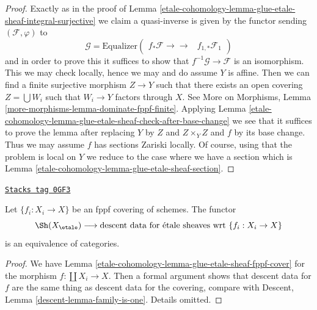 \begin{proof}
Exactly as in the proof of
Lemma \ref{etale-cohomology-lemma-glue-etale-sheaf-integral-surjective}
we claim a quasi-inverse is given by the functor sending
$(\mathcal{F}, \varphi)$ to
$$
\mathcal{G} =
\text{Equalizer}\left(
\begin{array}{cc}f_*\mathcal{F}
\longrightarrow\longrightarrow & f_{1, *}\mathcal{F}_1\end{array}
\right)
$$
and in order to prove this it suffices to show that
$f^{-1}\mathcal{G} \to \mathcal{F}$ is an isomorphism.
This we may check locally, hence we may and do assume $Y$
is affine. Then we can find a finite surjective morphism
$Z \to Y$ such that there exists an open covering
$Z = \bigcup W_i$ such that $W_i \to Y$ factors through $X$.
See
More on Morphisms, Lemma \ref{more-morphisms-lemma-dominate-fppf-finite}.
Applying Lemma
\ref{etale-cohomology-lemma-glue-etale-sheaf-check-after-base-change}
we see that it suffices to prove
the lemma after replacing $Y$ by $Z$ and $Z \times_Y Z$ and $f$
by its base change. Thus we may assume $f$ has sections Zariski locally.
Of course, using that the problem is local on $Y$ we reduce
to the case where we have a section which is
Lemma \ref{etale-cohomology-lemma-glue-etale-sheaf-section}.
\end{proof}

\begin{lemma}
\label{etale-cohomology-lemma-glue-etale-sheaf-fppf}
\href{https://stacks.math.columbia.edu/tag/0GF3}{\texttt{Stacks tag 0GF3}}

Let $\{f_i : X_i \to X\}$ be an fppf covering of schemes.
The functor
$$
\Sh(X_\etale)
\longrightarrow
\text{descent data for \'etale sheaves wrt }\{f_i : X_i \to X\}
$$
is an equivalence of categories.
\end{lemma}

\begin{proof}
We have Lemma \ref{etale-cohomology-lemma-glue-etale-sheaf-fppf-cover}
for the morphism $f : \coprod X_i \to X$.
Then a formal argument shows that descent data for $f$
are the same thing as descent data for the covering, compare
with Descent, Lemma \ref{descent-lemma-family-is-one}.
Details omitted.
\end{proof}

